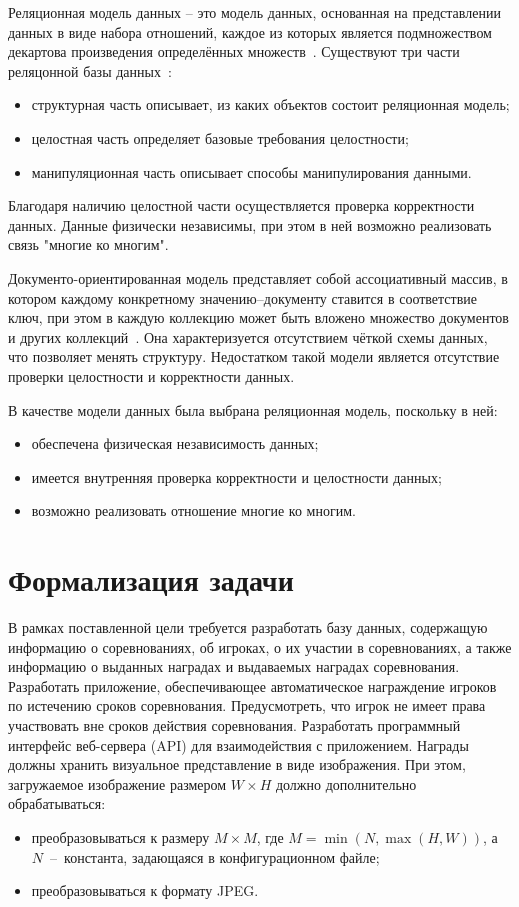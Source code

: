 Реляционная модель данных – это модель данных, основанная на 
представлении данных в виде набора отношений, каждое из которых является 
подмножеством декартова произведения определённых множеств~\cite{karpova}. Существуют три части реляцонной базы данных~\cite{relationdb}:
\begin{itemize}
	\item структурная часть описывает, из каких объектов состоит реляционная модель;
	\item целостная часть определяет базовые требования целостности;
	\item манипуляционная часть описывает способы манипулирования данными.
\end{itemize}
Благодаря наличию целостной части осуществляется проверка корректности данных. Данные физически независимы, при этом в ней возможно реализовать связь "многие ко многим".

Документо-ориентированная модель представляет собой ассоциативный массив, в котором каждому конкретному значению--документу ставится в соответствие ключ, при этом в каждую коллекцию может быть вложено множество документов и других коллекций~\cite{documentoriented}. Она характеризуется отсутствием чёткой схемы данных, что позволяет менять структуру. Недостатком такой модели является отсутствие проверки целостности и корректности данных.

В качестве модели данных была выбрана реляционная модель, поскольку в ней:
\begin{itemize}
	\item обеспечена физическая независимость данных;
	\item имеется внутренняя проверка корректности и целостности данных;
	\item возможно реализовать отношение многие ко многим.
\end{itemize} 

\section{Формализация задачи}

В рамках поставленной цели требуется разработать базу данных, содержащую информацию о соревнованиях, об игроках, о их участии в соревнованиях, а также информацию о выданных наградах и выдаваемых наградах соревнования. Разработать приложение, обеспечивающее автоматическое награждение игроков по истечению сроков соревнования.  Предусмотреть, что игрок не имеет права участвовать вне сроков действия соревнования. Разработать программный интерфейс веб-сервера (API) для взаимодействия с приложением. Награды должны хранить визуальное представление в виде изображения. При этом, загружаемое изображение размером $W \times H$ должно дополнительно обрабатываться:
\begin{itemize}
	\item преобразовываться к размеру $M \times M$, где $M=\min(N,\max(H,W))$, а $N$~--~константа, задающаяся в конфигурационном файле;
	\item преобразовываться к формату JPEG.
\end{itemize}

